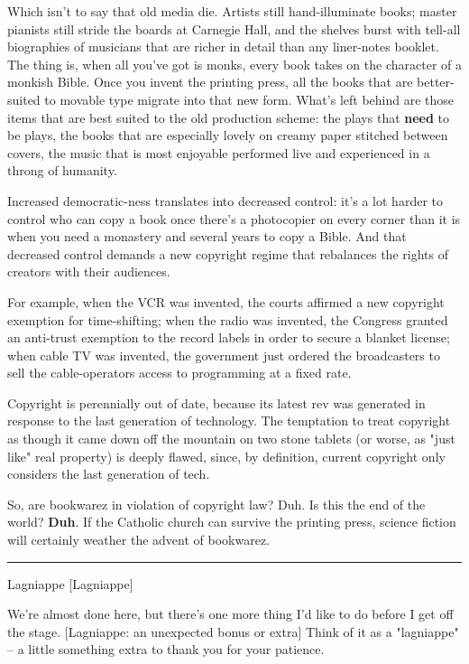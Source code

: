 Which isn't to say that old media die. Artists still
hand-illuminate books; master pianists still stride the boards at
Carnegie Hall, and the shelves burst with tell-all biographies of
musicians that are richer in detail than any liner-notes booklet.
The thing is, when all you've got is monks, every book takes on the
character of a monkish Bible. Once you invent the printing press,
all the books that are better-suited to movable type migrate into
that new form. What's left behind are those items that are best
suited to the old production scheme: the plays that \textbf{need}
to be plays, the books that are especially lovely on creamy paper
stitched between covers, the music that is most enjoyable performed
live and experienced in a throng of humanity.

Increased democratic-ness translates into decreased control: it's a
lot harder to control who can copy a book once there's a
photocopier on every corner than it is when you need a monastery
and several years to copy a Bible. And that decreased control
demands a new copyright regime that rebalances the rights of
creators with their audiences.

For example, when the VCR was invented, the courts affirmed a new
copyright exemption for time-shifting; when the radio was invented,
the Congress granted an anti-trust exemption to the record labels
in order to secure a blanket license; when cable TV was invented,
the government just ordered the broadcasters to sell the
cable-operators access to programming at a fixed rate.

Copyright is perennially out of date, because its latest rev was
generated in response to the last generation of technology. The
temptation to treat copyright as though it came down off the
mountain on two stone tablets (or worse, as "just like" real
property) is deeply flawed, since, by definition, current copyright
only considers the last generation of tech.

So, are bookwarez in violation of copyright law? Duh. Is this the
end of the world? \textbf{Duh}. If the Catholic church can survive
the printing press, science fiction will certainly weather the
advent of bookwarez.

\begin{center}\rule{3in}{0.4pt}\end{center}

Lagniappe [Lagniappe]

We're almost done here, but there's one more thing I'd like to do
before I get off the stage. [Lagniappe: an unexpected bonus or
extra] Think of it as a "lagniappe" -- a little something extra to
thank you for your patience.

